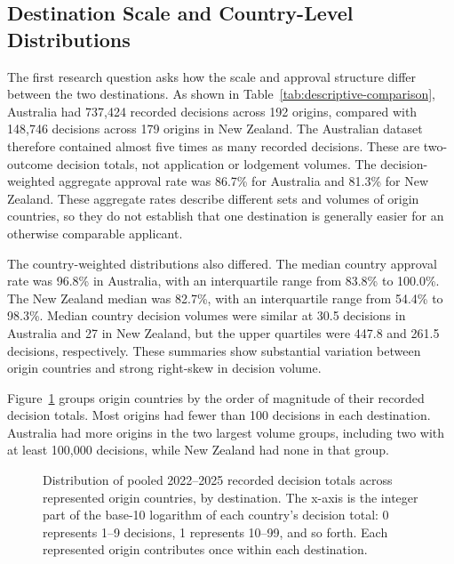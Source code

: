 \documentclass[runningheads]{llncs}
\begin{document}
\subsection{Destination Scale and Country-Level Distributions}

The first research question asks how the scale and approval structure differ between the two destinations. As shown in Table~\ref{tab:descriptive-comparison}, Australia had 737,424 recorded decisions across 192 origins, compared with 148,746 decisions across 179 origins in New Zealand. The Australian dataset therefore contained almost five times as many recorded decisions. These are two-outcome decision totals, not application or lodgement volumes. The decision-weighted aggregate approval rate was 86.7\% for Australia and 81.3\% for New Zealand. These aggregate rates describe different sets and volumes of origin countries, so they do not establish that one destination is generally easier for an otherwise comparable applicant.



The country-weighted distributions also differed. The median country approval rate was 96.8\% in Australia, with an interquartile range from 83.8\% to 100.0\%. The New Zealand median was 82.7\%, with an interquartile range from 54.4\% to 98.3\%. Median country decision volumes were similar at 30.5 decisions in Australia and 27 in New Zealand, but the upper quartiles were 447.8 and 261.5 decisions, respectively. These summaries show substantial variation between origin countries and strong right-skew in decision volume.

Figure~\ref{fig:decision-volume-log10-bins} groups origin countries by the order of magnitude of their recorded decision totals. Most origins had fewer than 100 decisions in each destination. Australia had more origins in the two largest volume groups, including two with at least 100,000 decisions, while New Zealand had none in that group.

\begin{figure}
\centering

\caption{Distribution of pooled 2022--2025 recorded decision totals across represented origin countries, by destination. The x-axis is the integer part of the base-10 logarithm of each country's decision total: 0 represents 1--9 decisions, 1 represents 10--99, and so forth. Each represented origin contributes once within each destination.}
\label{fig:decision-volume-log10-bins}
\end{figure}
\end{document}

